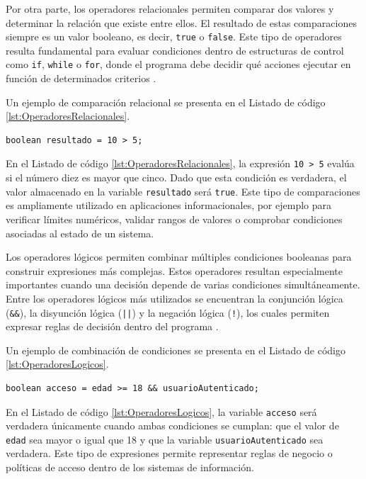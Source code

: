 \documentclass[12pt,twoside]{book}
\begin{document}
					Por otra parte, los operadores relacionales permiten comparar dos valores y determinar la relación que existe entre ellos. El resultado de estas comparaciones siempre es un valor booleano, es decir, \texttt{true} o \texttt{false}. Este tipo de operadores resulta fundamental para evaluar condiciones dentro de estructuras de control como \texttt{if}, \texttt{while} o \texttt{for}, donde el programa debe decidir qué acciones ejecutar en función de determinados criterios \cite{Sebesta2018Concepts}.
					
					Un ejemplo de comparación relacional se presenta en el Listado de código \ref{lst:OperadoresRelacionales}.
					
					\begin{lstlisting}[style=Java,caption={Uso de operadores relacionales en Java.},label={lst:OperadoresRelacionales}]
						boolean resultado = 10 > 5; \end{lstlisting}
					
					\noindent
					En el Listado de código \ref{lst:OperadoresRelacionales}, la expresión \texttt{10 > 5} evalúa si el número diez es mayor que cinco. Dado que esta condición es verdadera, el valor almacenado en la variable \texttt{resultado} será \texttt{true}. Este tipo de comparaciones es ampliamente utilizado en aplicaciones informacionales, por ejemplo para verificar límites numéricos, validar rangos de valores o comprobar condiciones asociadas al estado de un sistema.
					
					Los operadores lógicos permiten combinar múltiples condiciones booleanas para construir expresiones más complejas. Estos operadores resultan especialmente importantes cuando una decisión depende de varias condiciones simultáneamente. Entre los operadores lógicos más utilizados se encuentran la conjunción lógica (\texttt{\&\&}), la disyunción lógica (\texttt{||}) y la negación lógica (\texttt{!}), los cuales permiten expresar reglas de decisión dentro del programa \cite{Sebesta2018Concepts,Pierce2002Types}.
					
					Un ejemplo de combinación de condiciones se presenta en el Listado de código \ref{lst:OperadoresLogicos}.
					
					\begin{lstlisting}[style=Java,caption={Uso de operadores lógicos en Java.},label={lst:OperadoresLogicos}]
	boolean acceso = edad >= 18 && usuarioAutenticado; \end{lstlisting}
					
					\noindent
					En el Listado de código \ref{lst:OperadoresLogicos}, la variable \texttt{acceso} será verdadera únicamente cuando ambas condiciones se cumplan: que el valor de \texttt{edad} sea mayor o igual que 18 y que la variable \texttt{usuarioAutenticado} sea verdadera. Este tipo de expresiones permite representar reglas de negocio o políticas de acceso dentro de los sistemas de información.
					
\end{document}
